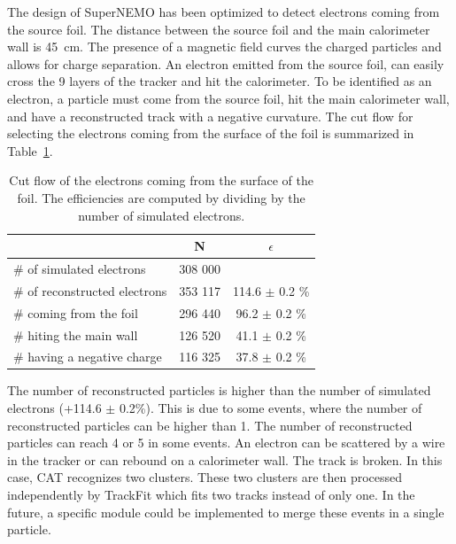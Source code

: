 \documentclass[main.tex]{subfiles}
\begin{document}
\noindent The design of SuperNEMO has been optimized to detect electrons coming from the source foil. The distance between the source foil and the main calorimeter wall is 45~cm. The presence of a magnetic field curves the charged particles and allows for charge separation. An electron emitted from the source foil, can easily cross the 9 layers of the tracker and hit the calorimeter. To be identified as an electron, a particle must come from the source foil, hit the main calorimeter wall, and have a reconstructed track with a negative curvature. The cut flow for selecting the electrons coming from the surface of the foil is summarized in Table~\ref{Cutflowelectron}.


\begin{table}[h!]
\begin{center}
\begin{tabular}{l|c|c}
 & N & $\epsilon$ \\
\toprule
$\#$ of simulated electrons & 308 000 & \\
\hline
$\#$ of reconstructed electrons & 353 117 & 114.6 $\pm$ 0.2 \%\\
$\#$ coming from the foil       & 296 440 & 96.2  $\pm$ 0.2 \%\\
$\#$ hiting the main wall       & 126 520 & 41.1  $\pm$ 0.2 \%\\
$\#$ having a negative charge   & 116 325 & 37.8  $\pm$ 0.2 \%\\
\bottomrule
\end{tabular}
\end{center}
\caption{Cut flow of the electrons coming from the surface of the foil. The efficiencies are computed by dividing by the number of simulated electrons.}
\label{Cutflowelectron}
\end{table}


\bigskip


\noindent The number of reconstructed particles is higher than the number of simulated electrons (+114.6 $\pm$ 0.2\%). This is due to some events, where the number of reconstructed particles can be higher than 1. The number of reconstructed particles can reach 4 or 5 in some events. An electron can be scattered by a wire in the tracker or can rebound on a calorimeter wall. The track is broken. In this case, CAT recognizes two clusters. These two clusters are then processed independently by TrackFit which fits two tracks instead of only one. In the future, a specific module could be implemented to merge these events in a single particle. 
\end{document}
